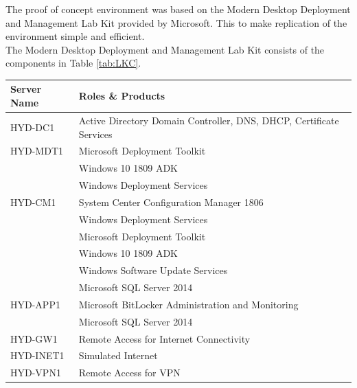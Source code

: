 The proof of concept environment was based on the Modern Desktop Deployment and Management Lab Kit provided by Microsoft. \autocite{Gallagher2018}
This to make replication of the environment simple and efficient.
\\
The Modern Desktop Deployment and Management Lab Kit consists of the components in Table \ref{tab:LKC}.
\\

\begin{table}[ht]
	\centering
	\begin{adjustbox}{width=1\textwidth}
		\begin{tabular}{l|l}
			Server Name  & Roles \& Products                                                  	 \\ 
			\hline
			HYD-DC1      & Active Directory Domain Controller, DNS, DHCP, Certificate Services 	   \\
			HYD-MDT1     & Microsoft Deployment Toolkit                                        		\\
			& Windows 10 1809 ADK                                                 					 \\
			& Windows Deployment Services                                         					  \\
			HYD-CM1      & System Center Configuration Manager 1806                            		   \\
			& Windows Deployment Services                                         						\\
			& Microsoft Deployment Toolkit                                         						 \\
			& Windows 10 1809 ADK                                                 			 			  \\
			& Windows Software Update Services                                        		  			   \\
			& Microsoft SQL Server 2014                                           						    \\
			HYD-APP1     & Microsoft BitLocker Administration and Monitoring                   				 \\
			& Microsoft SQL Server 2014                                          							  \\
			HYD-GW1      & Remote Access for Internet Connectivity                           				   \\
			HYD-INET1    & Simulated Internet                                                			 	    \\
			HYD-VPN1     & Remote Access for VPN                                             				     \\

\end{tabular}
\end{adjustbox}
\end{table}
